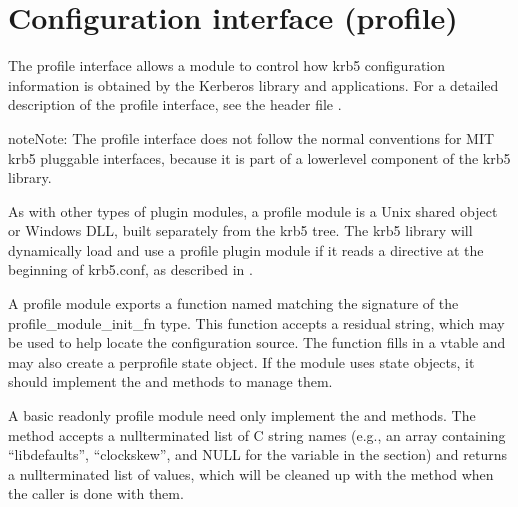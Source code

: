 \documentclass[letterpaper,10pt,english]{sphinxmanual}
\begin{document}
\sphinxstepscope


\section{Configuration interface (profile)}
\label{\detokenize{plugindev/profile:configuration-interface-profile}}\label{\detokenize{plugindev/profile:profile-plugin}}\label{\detokenize{plugindev/profile::doc}}
\sphinxAtStartPar
The profile interface allows a module to control how krb5
configuration information is obtained by the Kerberos library and
applications.  For a detailed description of the profile interface,
see the header file .

\begin{sphinxadmonition}{note}{Note:}
\sphinxAtStartPar
The profile interface does not follow the normal conventions
for MIT krb5 pluggable interfaces, because it is part of a
lower\sphinxhyphen{}level component of the krb5 library.
\end{sphinxadmonition}

\sphinxAtStartPar
As with other types of plugin modules, a profile module is a Unix
shared object or Windows DLL, built separately from the krb5 tree.
The krb5 library will dynamically load and use a profile plugin module
if it reads a  directive at the beginning of krb5.conf, as
described in .

\sphinxAtStartPar
A profile module exports a function named 
matching the signature of the profile\_module\_init\_fn type.  This
function accepts a residual string, which may be used to help locate
the configuration source.  The function fills in a vtable and may also
create a per\sphinxhyphen{}profile state object.  If the module uses state objects,
it should implement the  and  methods to manage
them.

\sphinxAtStartPar
A basic read\sphinxhyphen{}only profile module need only implement the
 and  methods.  The  method
accepts a null\sphinxhyphen{}terminated list of C string names (e.g., an array
containing “libdefaults”, “clockskew”, and NULL for the 
variable in the  section) and returns a
null\sphinxhyphen{}terminated list of values, which will be cleaned up with the
 method when the caller is done with them.
\end{document}
